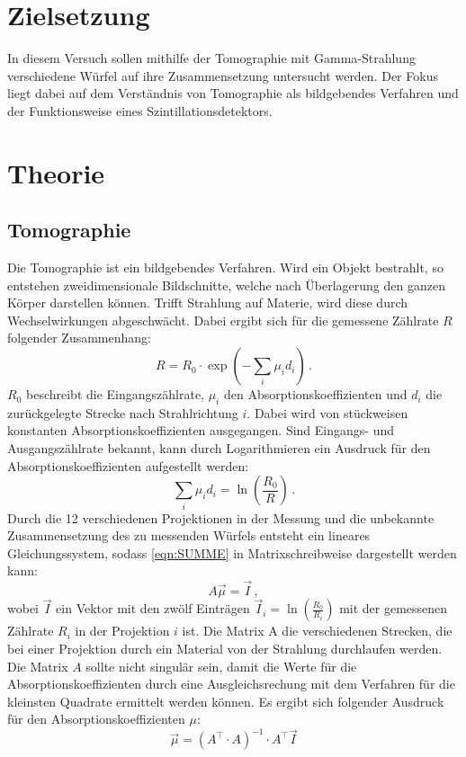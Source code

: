 \section{Zielsetzung}
In diesem Versuch sollen mithilfe der Tomographie mit Gamma-Strahlung verschiedene Würfel auf ihre Zusammensetzung untersucht werden.
Der Fokus liegt dabei auf dem Verständnis von Tomographie als bildgebendes Verfahren und der Funktionsweise eines Szintillationsdetektors.

\section{Theorie}
\label{sec:Theorie}

\subsection{Tomographie}
Die Tomographie ist ein bildgebendes Verfahren.
Wird ein Objekt bestrahlt, so entstehen zweidimensionale Bildschnitte, welche nach Überlagerung den ganzen Körper darstellen können.
Trifft Strahlung auf Materie, wird diese durch Wechselwirkungen abgeschwächt.
Dabei ergibt sich für die gemessene Zählrate $R$ folgender Zusammenhang:
\begin{equation*}
    R = R_0 \cdot \exp{(- \sum_{i} \mu_i d_i)} \, .
\end{equation*}
$R_0$ beschreibt die Eingangszählrate, $\mu_i$ den Absorptionskoeffizienten und $d_i$ die zurückgelegte Strecke nach Strahlrichtung $i$.
Dabei wird von stückweisen konstanten Absorptionskoeffizienten ausgegangen. 
Sind Eingangs- und Ausgangszählrate bekannt, kann durch Logarithmieren ein Ausdruck für den Absorptionskoeffizienten aufgestellt werden:
\begin{equation}
    \sum_{i} \mu_i d_i = \ln\left(\frac{R_0}{R}\right) \, .
    \label{eqn:SUMME}
\end{equation}
Durch die 12 verschiedenen Projektionen in der Messung und die unbekannte Zusammensetzung des zu messenden Würfels 
entsteht ein lineares Gleichungssystem, sodass \eqref{eqn:SUMME} in Matrixschreibweise dargestellt werden kann:
\begin{equation}
    A \vec{\mu} = \vec{I} \, ,
    \label{eqn:matrix}
\end{equation}
wobei $\vec{I}$ ein Vektor mit den zwölf Einträgen $\vec{I}_i = \ln\left(\frac{R_0}{R_i}\right)$ mit der gemessenen Zählrate $R_i$ in der Projektion $i$ ist.
Die Matrix A die verschiedenen Strecken, die bei einer Projektion durch ein Material von der Strahlung durchlaufen werden.
Die Matrix $A$ sollte nicht singulär sein, damit die Werte für die Absorptionskoeffizienten durch eine Ausgleichsrechung mit dem Verfahren für die kleinsten Quadrate ermittelt werden können.
Es ergibt sich folgender Ausdruck für den Absorptionskoeffizienten $\mu$:
\begin{equation*}
    \vec{\mu} = \left( A^\top \cdot A \right)^{-1} \cdot A^\top \vec{I}
\end{equation*}

